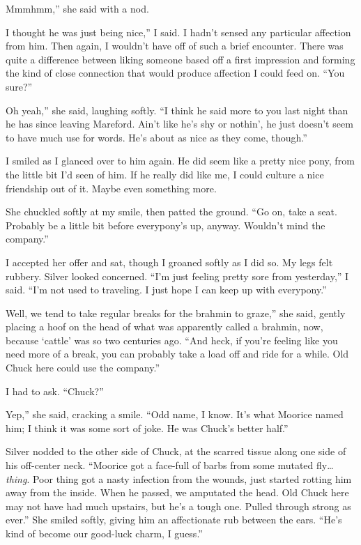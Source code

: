 \leavevmode{}Mmmhmm,” she said with a nod.

\leavevmode{}I thought he was just being nice,” I said. I hadn’t sensed any particular affection from him. Then again, I wouldn’t have off of such a brief encounter. There was quite a difference between liking someone based off a first impression and forming the kind of close connection that would produce affection I could feed on. “You sure?”

\leavevmode{}Oh yeah,” she said, laughing softly. “I think he said more to you last night than he has since leaving Mareford. Ain’t like he’s shy or nothin’, he just doesn’t seem to have much use for words. He’s about as nice as they come, though.”

I smiled as I glanced over to him again. He did seem like a pretty nice pony, from the little bit I’d seen of him. If he really did like me, I could culture a nice friendship out of it. Maybe even something more.

She chuckled softly at my smile, then patted the ground. “Go on, take a seat. Probably be a little bit before everypony’s up, anyway. Wouldn’t mind the company.”

I accepted her offer and sat, though I groaned softly as I did so. My legs felt rubbery. Silver looked concerned. “I’m just feeling pretty sore from yesterday,” I said. “I’m not used to traveling. I just hope I can keep up with everypony.”

\leavevmode{}Well, we tend to take regular breaks for the brahmin to graze,” she said, gently placing a hoof on the head of what was apparently called a brahmin, now, because ‘cattle’ was so two centuries ago. “And heck, if you’re feeling like you need more of a break, you can probably take a load off and ride for a while. Old Chuck here could use the company.”

I had to ask. “Chuck?”

\leavevmode{}Yep,” she said, cracking a smile. “Odd name, I know. It’s what Moorice named him; I think it was some sort of joke. He was Chuck’s better half.”

Silver nodded to the other side of Chuck, at the scarred tissue along one side of his off-center neck. “Moorice got a face-full of barbs from some mutated fly… \textit{thing}. Poor thing got a nasty infection from the wounds, just started rotting him away from the inside. When he passed, we amputated the head. Old Chuck here may not have had much upstairs, but he’s a tough one. Pulled through strong as ever.” She smiled softly, giving him an affectionate rub between the ears. “He’s kind of become our good-luck charm, I guess.”

